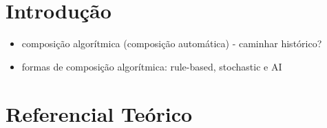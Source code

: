 \documentclass{automatextcc}
\begin{document}
\listoftables




\chapter{Introdução}

\begin{itemize}
    \item composição algorítmica (composição automática) - caminhar histórico?
    \item formas de composição algorítmica: rule-based, stochastic e AI
\end{itemize}





\chapter{Referencial Teórico}

\end{document}
